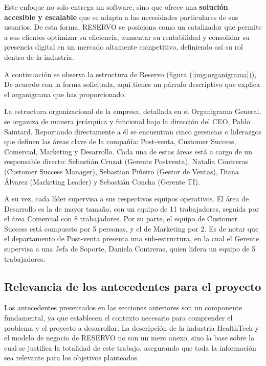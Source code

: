 Este enfoque no solo entrega un software, sino que ofrece una \textbf{solución accesible y escalable} que se adapta a las necesidades particulares de sus usuarios. De esta forma, RESERVO se posiciona como un catalizador que permite a sus clientes optimizar su eficiencia, aumentar su rentabilidad y consolidar su presencia digital en un mercado altamente competitivo, definiendo así su rol dentro de la industria.

A continuación se observa la estructura de Reservo (figura (\ref{img:organigrama})), De acuerdo con la forma solicitada, aquí tienes un párrafo descriptivo que explica el organigrama que has proporcionado.

La estructura organizacional de la empresa, detallada en el Organigrama General, se organiza de manera jerárquica y funcional bajo la dirección del CEO, Pablo Saintard. Reportando directamente a él se encuentran cinco gerencias o liderazgos que definen las áreas clave de la compañía: Post-venta, Customer Success, Comercial, Marketing y Desarrollo. Cada una de estas áreas está a cargo de un responsable directo: Sebastián Cruzat (Gerente Postventa), Natalia Contreras (Customer Success Manager), Sebastian Piñeiro (Gestor de Ventas), Diana Álvarez (Marketing Leader) y Sebastián Concha (Gerente TI).

A su vez, cada líder supervisa a sus respectivos equipos operativos. El área de Desarrollo es la de mayor tamaño, con un equipo de 11 trabajadores, seguida por el área Comercial con 8 trabajadores. Por su parte, el equipo de Customer Success está compuesto por 5 personas, y el de Marketing por 2. Es de notar que el departamento de Post-venta presenta una sub-estructura, en la cual el Gerente supervisa a una Jefa de Soporte, Daniela Contreras, quien lidera un equipo de 5 trabajadores.


\subsection{Relevancia de los antecedentes para el proyecto}

Los antecedentes presentados en las secciones anteriores son un componente fundamental, ya que establecen el contexto necesario para comprender el problema y el proyecto a desarrollar. La descripción de la industria HealthTech y el modelo de negocio de RESERVO no son un mero anexo, sino la base sobre la cual se justifica la totalidad de este trabajo, asegurando que toda la información sea relevante para los objetivos planteados.

